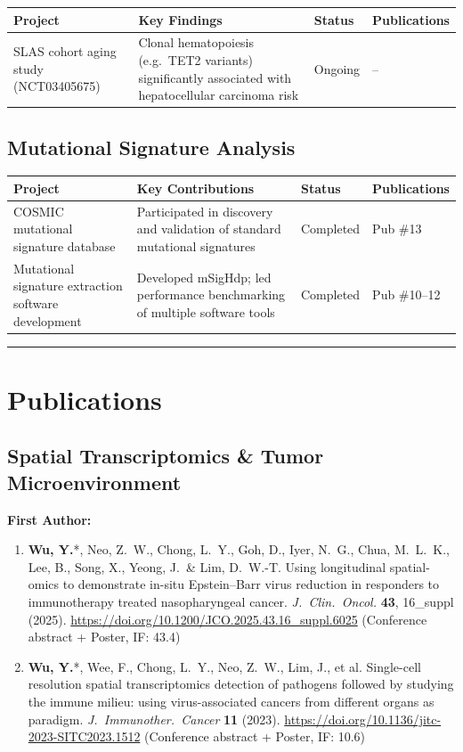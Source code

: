\documentclass[11pt,a4paper]{article}
\begin{document}
\begin{tabular}{@{}p{4.2cm}p{7.8cm}p{1.8cm}p{2.2cm}@{}}
\toprule
\textbf{Project} & \textbf{Key Findings} & \textbf{Status} & \textbf{Publications} \\
\midrule
SLAS cohort aging study (NCT03405675) & Clonal hematopoiesis (e.g.\ TET2 variants) significantly associated with hepatocellular carcinoma risk & Ongoing & -- \\
\bottomrule
\end{tabular}

\subsection*{Mutational Signature Analysis}

\begin{tabular}{@{}p{4.2cm}p{5.2cm}p{1.8cm}p{2.2cm}@{}}
\toprule
\textbf{Project} & \textbf{Key Contributions} & \textbf{Status} & \textbf{Publications} \\
\midrule
COSMIC mutational signature database & Participated in discovery and validation of standard mutational signatures & Completed & Pub \#13 \\
Mutational signature extraction software development & Developed mSigHdp; led performance benchmarking of multiple software tools & Completed & Pub \#10--12 \\
\bottomrule
\end{tabular}

\vspace{0.5em}
\hrule
\vspace{0.5em}

\section*{Publications}

\subsection*{Spatial Transcriptomics \& Tumor Microenvironment}

\textbf{First Author:}
\begin{enumerate}
\item \textbf{Wu, Y.}*, Neo, Z.\ W., Chong, L.\ Y., Goh, D., Iyer, N.\ G., Chua, M.\ L.\ K., Lee, B., Song, X., Yeong, J.\ \& Lim, D.\ W.-T. Using longitudinal spatial-omics to demonstrate in-situ Epstein--Barr virus reduction in responders to immunotherapy treated nasopharyngeal cancer. \textit{J.\ Clin.\ Oncol.} \textbf{43}, 16\_suppl (2025). \url{https://doi.org/10.1200/JCO.2025.43.16_suppl.6025} (Conference abstract + Poster, IF: 43.4)
\item \textbf{Wu, Y.}*, Wee, F., Chong, L.\ Y., Neo, Z.\ W., Lim, J., et al. Single-cell resolution spatial transcriptomics detection of pathogens followed by studying the immune milieu: using virus-associated cancers from different organs as paradigm. \textit{J.\ Immunother.\ Cancer} \textbf{11} (2023). \url{https://doi.org/10.1136/jitc-2023-SITC2023.1512} (Conference abstract + Poster, IF: 10.6)
\end{enumerate}
\end{document}
